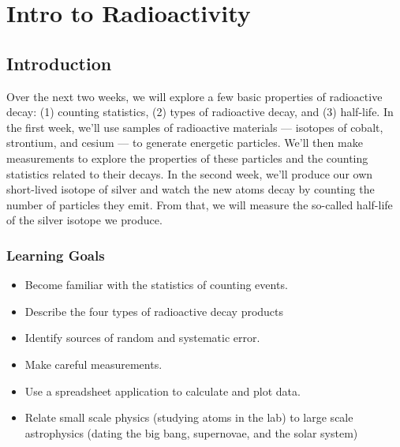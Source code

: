 \chapter{Intro to Radioactivity}






\section{Introduction}

Over the next two weeks, we will explore a few basic properties of radioactive decay: (1) counting statistics, (2) types of radioactive decay, and (3) half-life. In the first week, we'll use samples of radioactive materials --- isotopes of cobalt, strontium, and cesium%
 --- to generate energetic particles. We'll then make measurements to explore the properties of these particles and the counting statistics related to their decays. In the second week, we’ll produce our own short-lived isotope of silver and watch the new atoms decay by counting the number of particles they emit. From that, we will measure the so-called half-life of the silver isotope we produce.

\subsection{Learning Goals}

\begin{itemize}
	\item Become familiar with the statistics of counting events.
	
	\item Describe the four types of radioactive decay products
	
	\item Identify sources of random and systematic error.
	
	\item Make careful measurements.
	
	\item Use a spreadsheet application to calculate and plot data.
	
	\item Relate small scale physics (studying atoms in the lab) to large scale astrophysics (dating the big bang, supernovae, and the solar system)
\end{itemize}


